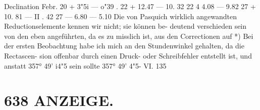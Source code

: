 \documentclass[12pt,a4paper]{article}
\begin{document}
{{{{{{{{Declination Febr.   20 +    3"5i ---   o"39   . 22 +  12.47 ---  10.  32 22 4    4.08 ---    9.82 27 +  10.  81 ---  II . 42 27 ---    6.80 ---    5.10 Die  von  Pasquich  wirklich  angewandten  Reductionselemente  kennen  wir  nicht;  sie  können  be- deutend verschieden    sein    von   den  eben  angeführten,  da    es  zu  misslich   ist,   aus   den  Correctionen  auf *)  Bei  der  ersten  Beobachtung  habe  ich  mich  an  den  Stundenwinkel  gehalten,  da  die  Rectascen- sion  offenbar  durch  einen  Druck-  oder  Schreibfehler  entstellt  ist,  und  anstatt  357°  49'  i4"5  sein  sollte 357°  49'  4"5- VI. 135


\section*{638  ANZEIGE.}

}}}}}}}}
\end{document}

